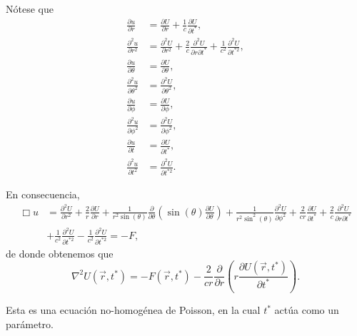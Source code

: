 \documentclass[12pt,a4paper]{book}
\begin{document}
Nótese que
\begin{align}
\frac{\partial u}{\partial r} &= \frac{\partial U}{\partial r} + \frac{1}{c}\frac{\partial U}{\partial t^*}, \\
\frac{\partial^2 u}{\partial r^2} &= \frac{\partial^2 U}{\partial r^2} + \frac{2}{c}\frac{\partial^2 U}{\partial r \partial t^*} + \frac{1}{c^2}\frac{\partial^2 U}{\partial t^{*2}}, \\
\frac{\partial u}{\partial \theta} &= \frac{\partial U}{\partial \theta}, \\
\frac{\partial^2 u}{\partial \theta^2} &= \frac{\partial^2 U}{\partial \theta^2}, \\
\frac{\partial u}{\partial \phi} &= \frac{\partial U}{\partial \phi}, \\
\frac{\partial^2 u}{\partial \phi^2} &= \frac{\partial^2 U}{\partial \phi^2}, \\
\frac{\partial u}{\partial t} &= \frac{\partial U}{\partial t^*}, \\
\frac{\partial^2 u}{\partial t^2} &= \frac{\partial^2 U}{\partial t^{*2}}.
\end{align}

En consecuencia,
\begin{align}
\Box u &= \frac{\partial^2 U}{\partial r^2} + \frac{2}{r}\frac{\partial U}{\partial r} + \frac{1}{r^2 \sin(\theta)}\frac{\partial}{\partial \theta}\left(\sin(\theta)\frac{\partial U}{\partial \theta}\right) + \frac{1}{r^2 \sin^2(\theta)}\frac{\partial^2 U}{\partial \phi^2} + \frac{2}{cr}\frac{\partial U}{\partial t^*} + \frac{2}{c}\frac{\partial^2 U}{\partial r \partial t^*} \nonumber \\
&+ \frac{1}{c^2}\frac{\partial^2 U}{\partial t^{*2}} - \frac{1}{c^2}\frac{\partial^2 U}{\partial t^{*2}} = -F,
\end{align}
de donde obtenemos que
\begin{equation}
\nabla^2 U(\vec{r}, t^*) = -F(\vec{r}, t^*) - \frac{2}{cr}\frac{\partial}{\partial r}\left(r\frac{\partial U(\vec{r}, t^*)}{\partial t^*}\right).
\end{equation}

Esta es una ecuación no-homogénea de Poisson, en la cual $t^*$ actúa como un parámetro.
\end{document}
